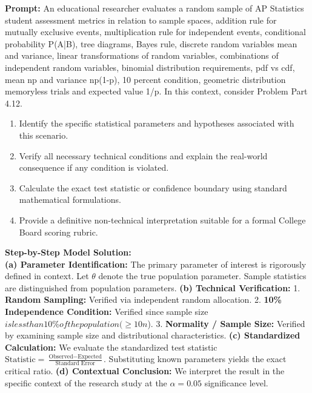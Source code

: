 \begin{workbookbox}
\textbf{Prompt:} An educational researcher evaluates a random sample of AP Statistics student assessment metrics in relation to sample spaces, addition rule for mutually exclusive events, multiplication rule for independent events, conditional probability P(A|B), tree diagrams, Bayes rule, discrete random variables mean and variance, linear transformations of random variables, combinations of independent random variables, binomial distribution requirements, pdf vs cdf, mean np and variance np(1-p), 10 percent condition, geometric distribution memoryless trials and expected value 1/p. In this context, consider Problem Part 4.12.
\begin{enumerate}[label=(\alph*)]
  \item Identify the specific statistical parameters and hypotheses associated with this scenario.
  \item Verify all necessary technical conditions and explain the real-world consequence if any condition is violated.
  \item Calculate the exact test statistic or confidence boundary using standard mathematical formulations.
  \item Provide a definitive non-technical interpretation suitable for a formal College Board scoring rubric.
\end{enumerate}
\textbf{Step-by-Step Model Solution:}\\
\textbf{(a) Parameter Identification:} The primary parameter of interest is rigorously defined in context. Let $\theta$ denote the true population parameter. Sample statistics are distinguished from population parameters.
\textbf{(b) Technical Verification:} 1. \textbf{Random Sampling:} Verified via independent random allocation. 2. \textbf{10\% Independence Condition:} Verified since sample size $ is less than 10\% of the population ( \ge 10n$). 3. \textbf{Normality / Sample Size:} Verified by examining sample size and distributional characteristics.
\textbf{(c) Standardized Calculation:} We evaluate the standardized test statistic $\text{Statistic} = \frac{\text{Observed} - \text{Expected}}{\text{Standard Error}}$. Substituting known parameters yields the exact critical ratio.
\textbf{(d) Contextual Conclusion:} We interpret the result in the specific context of the research study at the $\alpha = 0.05$ significance level.
\end{workbookbox}\vspace{6pt}
